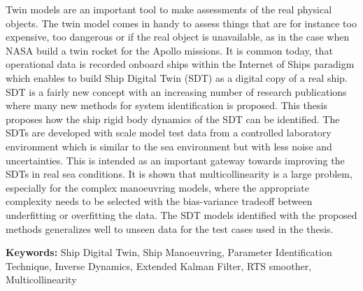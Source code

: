 
Twin models are an important tool to make assessments of the real physical objects. The twin model comes in handy to assess things that are for instance too expensive, too dangerous or if the real object is unavailable, as in the case when NASA build a twin rocket for the Apollo missions. 
It is common today, that operational data is recorded onboard ships within the Internet of Ships paradigm which enables to build Ship Digital Twin (SDT) as a digital copy of a real ship. SDT is a fairly new concept with an increasing number of research publications where many new methods for system identification is proposed.
\noindent This thesis proposes how the ship rigid body dynamics of the SDT can be identified. 
\noindent The SDTs are developed with scale model test data from a controlled laboratory environment which is similar to the sea environment but with less noise and uncertainties. This is intended as an important gateway towards improving the SDTs in real sea conditions. 
\noindent It is shown that multicollinearity is a large problem, especially for the complex manoeuvring models, where the appropriate complexity needs to be selected with the bias-variance tradeoff between underfitting or overfitting the data.
\noindent The SDT models identified with the proposed methods generalizes well to unseen data for the test cases used in the thesis.

\vspace{0.1cm}
\textbf{Keywords:} Ship Digital Twin, Ship Manoeuvring, Parameter Identification Technique, Inverse Dynamics, Extended Kalman Filter, RTS smoother, Multicollinearity

